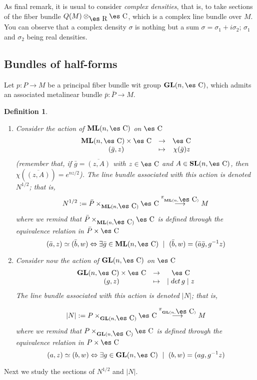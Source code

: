 \documentclass[12pt]{article}
\theoremstyle{plain}
\newtheorem{definition}{Definition}
\def\ben{\begin{enumerate}}
\def\een{\end{enumerate}}
\def\mapping#1{\mathrel{\mathop{\longrightarrow}\limits^{#1}}}
\def\GL{{\bf GL}(n,\Complex )}
\def\SL{{\bf SL}(n,\Complex )}
\def\ML{{\bf ML}(n,\Complex )}
\def\Real{\mbox{\es R}}
\def\Complex{\mbox{\es C}}
\begin{document}
As final remark, it is usual to consider {\it complex densities},
that is, to take sections of the fiber bundle $Q(M) \otimes_{\Real}
\Complex$,
which is a complex line bundle over $M$. You can observe that a complex
density
$\sigma$ is nothing but a sum $\sigma = \sigma_1 + i\sigma_2$;
$\sigma_1$ and $\sigma_2$ being real densities.



\subsection{Bundles of half-forms}



Let $p\colon P \to M$ be a principal fiber bundle wit group $\GL$,
which admits an associated metalinear bundle $\bar p : \bar P \to M$.

\begin{definition}
\ben
\item
Consider the action of $\ML$ on $\Complex$
$$
\begin{array}{ccc}
\ML \times \Complex & \to & \Complex
\\
(\bar g,z) & \mapsto & \chi (\bar g)z
\end{array}
$$
(remember that, if $\bar g = \overline{(z,A)}$
with $z \in \Complex$ and $A \in \SL$, then $\chi (\overline{(z,A)}) =
e^{nz/2}$).
The line bundle associated with this action is denoted $N^{1/2}$; that
is,
$$
N^{1/2} := \bar P \times_{\ML} \Complex \mapping{\pi_{\ML}} M
$$
where we remind that $\bar P \times_{\ML} \Complex$
is defined through the equivalence relation in $\bar P \times \Complex$
$$
(\bar a,z) \simeq (\bar b,w)
\Leftrightarrow
\exists \bar g \in \ML \ \mid \ (\bar b,w)=(\bar a \bar g,g^{-1}z)
$$
\item
Consider now the action of $\GL$ on $\Complex$
$$
\begin{array}{ccc}
\GL \times \Complex & \to & \Complex
\\
(g,z) & \mapsto & \mid det\, g \mid z
\end{array}
$$
The line bundle associated with this action is denoted $| N |$; that is,

$$
| N | := P \times_{\GL} \Complex \mapping{\pi_{\GL}} M
$$
where we remind that $P \times_{\GL} \Complex$
is defined through the equivalence relation in $P \times \Complex$
$$
(a,z) \simeq (b,w) \Leftrightarrow \exists g \in \GL \ \mid \
(b,w)=(ag,g^{-1}z)
$$
\een
\label{absn}
\end{definition}

Next we study the sections of $N^{1/2}$ and $| N |$.
\end{document}
